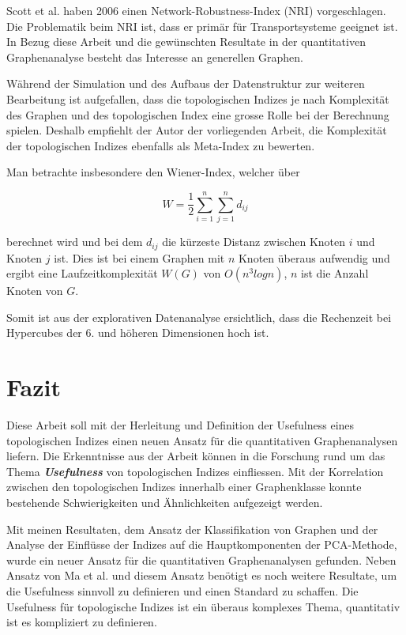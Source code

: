 Scott et al. \cite{scott_network_2006} haben 2006 einen Network-Robustness-Index (NRI) vorgeschlagen.
Die Problematik beim NRI ist, dass er primär für Transportsysteme geeignet ist. 
In Bezug diese Arbeit und die gewünschten Resultate in der quantitativen Graphenanalyse besteht das Interesse an generellen Graphen.

Während der Simulation und des Aufbaus der Datenstruktur zur weiteren Bearbeitung ist aufgefallen, dass die topologischen Indizes je nach Komplexität des Graphen und des topologischen Index eine grosse Rolle bei der Berechnung spielen.
Deshalb empfiehlt der Autor der vorliegenden Arbeit, die Komplexität der topologischen Indizes ebenfalls als Meta-Index zu bewerten.

Man betrachte insbesondere den Wiener-Index, welcher über

\begin{equation}
    W = \frac{1}{2} \sum_{i=1}^{n} \sum_{j=1}^{n} d_{ij}
\end{equation}

berechnet wird und bei dem $d_{ij}$ die kürzeste Distanz zwischen Knoten $i$ und Knoten $j$ ist.
Dies ist bei einem Graphen mit $n$ Knoten überaus aufwendig und ergibt eine Laufzeitkomplexität $W(G)$ von $O(n^3 log n)$, $n$ ist die Anzahl Knoten von $G$.

Somit ist aus der explorativen Datenanalyse ersichtlich, dass die Rechenzeit bei Hypercubes der 6. und höheren Dimensionen hoch ist.

\section{Fazit}

Diese Arbeit soll mit der Herleitung und Definition der Usefulness eines topologischen Indizes einen neuen Ansatz für die quantitativen Graphenanalysen liefern.
Die Erkenntnisse aus der Arbeit können in die Forschung rund um das Thema \textit{\textbf{Usefulness}} von topologischen Indizes einfliessen.
Mit der Korrelation zwischen den topologischen Indizes innerhalb einer Graphenklasse konnte bestehende Schwierigkeiten und Ähnlichkeiten aufgezeigt werden.

Mit meinen Resultaten, dem Ansatz der Klassifikation von Graphen und der Analyse der Einflüsse der Indizes auf die Hauptkomponenten der PCA-Methode, wurde ein neuer Ansatz für die quantitativen Graphenanalysen gefunden.
Neben Ansatz von Ma et al. und diesem Ansatz benötigt es noch weitere Resultate, um die Usefulness sinnvoll zu definieren und einen Standard zu schaffen. 
Die Usefulness für topologische Indizes ist ein überaus komplexes Thema, quantitativ ist es kompliziert zu definieren.

